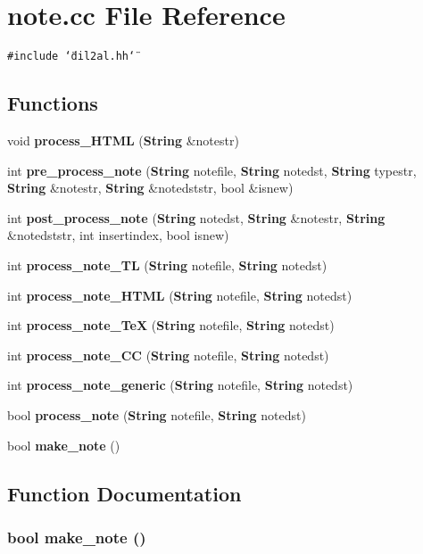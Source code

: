 \section{note.cc File Reference}
\label{note_8cc}
{\tt \#include \char`\"{}dil2al.hh\char`\"{}}\par
\subsection*{Functions}
\begin{CompactItemize}
\item 
void {\bf process\_\-HTML} ({\bf String} \&notestr)
\item 
int {\bf pre\_\-process\_\-note} ({\bf String} notefile, {\bf String} notedst, {\bf String} typestr, {\bf String} \&notestr, {\bf String} \&notedststr, bool \&isnew)
\item 
int {\bf post\_\-process\_\-note} ({\bf String} notedst, {\bf String} \&notestr, {\bf String} \&notedststr, int insertindex, bool isnew)
\item 
int {\bf process\_\-note\_\-TL} ({\bf String} notefile, {\bf String} notedst)
\item 
int {\bf process\_\-note\_\-HTML} ({\bf String} notefile, {\bf String} notedst)
\item 
int {\bf process\_\-note\_\-Te\-X} ({\bf String} notefile, {\bf String} notedst)
\item 
int {\bf process\_\-note\_\-CC} ({\bf String} notefile, {\bf String} notedst)
\item 
int {\bf process\_\-note\_\-generic} ({\bf String} notefile, {\bf String} notedst)
\item 
bool {\bf process\_\-note} ({\bf String} notefile, {\bf String} notedst)
\item 
bool {\bf make\_\-note} ()
\end{CompactItemize}


\subsection{Function Documentation}
\subsubsection{\setlength{\rightskip}{0pt plus 5cm}bool make\_\-note ()}\label{note_8cc_a9}





